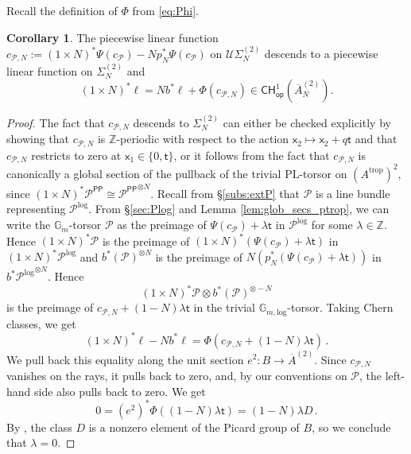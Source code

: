 \documentclass[11pt]{article}
\def\CHop{\mathsf{CH}_{\mathsf{op}}}
\def\PL{\mathrm{PL}}
\newcommand{\trop}{\mathrm{trop}}
\renewcommand{\log}{\mathrm{log}}
\newcommand{\barA}{\overline{A}}
\newcommand{\sfpp}{\mathsf{PP}}
\newcommand{\tropA}{{A^{\trop}}}
\theoremstyle{definition}
\newtheorem{corollary}[definition]{Corollary}
\begin{document}
Recall the definition of $\Phi$ from \eqref{eq:Phi}.

\begin{corollary}\label{cor:pp_corr_poincare_precise}
	The piecewise linear function $c_{\mathcal P,N}:=(1\times N)^{\ast}\Psi(c_{\mathcal P})-Np_N^{\ast}\Psi(c_{\mathcal P})$
	on $\mathcal{U}\Sigma_N^{(2)}$ descends to a piecewise linear function on $\Sigma_N^{(2)}$ and
	$$(1\times N)^{\ast}\ell=Nb^{\ast}\ell+\Phi(c_{\mathcal P,N}) \in \CHop^1(\barA_N^{(2)}).$$
\end{corollary}

\begin{proof}
	The fact that $c_{\mathcal P,N}$ descends to $\Sigma_N^{(2)}$ can either be checked explicitly
	by showing that $c_{\mathcal P,N}$ is $\mathbb{Z}$-periodic with respect to the action $\mathsf{x}_2\mapsto \mathsf{x}_2+q\mathsf{t}$
	and that $c_{\mathcal P,N}$ restricts to zero at $\mathsf{x}_1\in \{0,\mathsf{t}\}$, or it follows from the fact that
	$c_{\mathcal P,N}$ is canonically a global section of the pullback of the trivial $\PL$-torsor
	on $(\tropA)^2$, since $(1\times N)^{\ast}\mathcal{P}^{\sfpp}\cong {\mathcal{P}^{\sfpp}}^{\otimes N}$. Recall from \S\ref{subs:extP}
	that $\mathcal{P}$ is a line bundle representing $\mathcal{P}^{\log}$.
	From \S\ref{sec:Plog} and Lemma \ref{lem:glob_secs_ptrop}, we can write
	the $\mathbb{G}_{m}$-torsor $\mathcal{P}$ as the preimage of $\Psi(c_{\mathcal P})+\lambda \mathsf{t}$ in $\mathcal{P}^{\log}$
	for some $\lambda\in \mathbb{Z}$. Hence $(1\times N)^{\ast}\mathcal{P}$ is the preimage of $(1\times N)^{\ast}(\Psi(c_{\mathcal P})+\lambda \mathsf{t})$
	in $(1\times N)^{\ast}\mathcal{P}^{\log}$ and $b^{\ast}(\mathcal{P})^{\otimes N}$ is the preimage of $N(p_N^{\ast}(\Psi(c_{\mathcal P})+\lambda \mathsf{t}))$
	in $b^{\ast}{\mathcal{P}^{\log}}^{\otimes N}$. Hence
	$$
    (1\times N)^{\ast}\mathcal{P}\otimes b^{\ast}(\mathcal{P})^{\otimes -N}
    $$
	is the preimage of $c_{\mathcal P,N}+(1-N)\lambda \mathsf{t}$ in the trivial $\mathbb{G}_{m,\log}$-torsor. Taking Chern classes, we get
	$$
    (1\times N)^{\ast}\ell-Nb^{\ast}\ell=\Phi(c_{\mathcal P,N}+(1-N)\lambda \mathsf{t})\,.
    $$
	We pull back this equality along the unit section $e^2:B \to \barA^{(2)}$. Since $c_{\mathcal P,N}$ vanishes on the rays, it pulls back to zero, and, by our conventions on $\mathcal P$, the left-hand side also pulls back to zero. We get
    $$
    0 = (e^2)^* \Phi((1-N)\lambda \mathsf{t}) = (1-N)\lambda D\,. $$
    By \cite[Corollary 1.6]{mumford_kodaira}, the class $D$ is a nonzero element of the Picard group of $B$, so we
	conclude that $\lambda=0$.
\end{proof}
\end{document}
